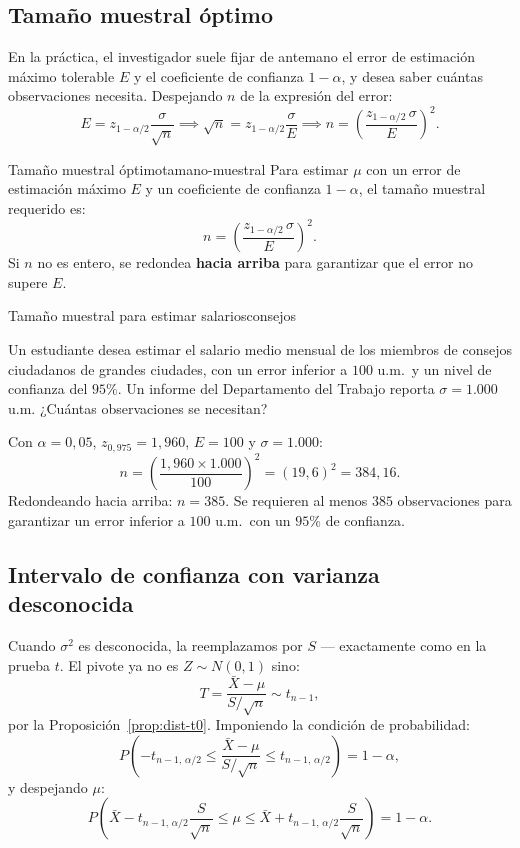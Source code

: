 \documentclass[12pt, a4paper]{book}
\numberwithin{equation}{chapter}
\begin{document}
\subsection{Tama\~{n}o muestral \'{o}ptimo}

En la pr\'{a}ctica, el investigador suele
fijar de antemano el error de estimaci\'{o}n
m\'{a}ximo tolerable $E$ y el coeficiente
de confianza $1-\alpha$, y desea saber
cu\'{a}ntas observaciones necesita. Despejando
$n$ de la expresi\'{o}n del error:
\[
E = z_{1-\alpha/2}
\frac{\sigma}{\sqrt{n}}
\implies \sqrt{n} =
z_{1-\alpha/2} \frac{\sigma}{E}
\implies n =
\left(\frac{z_{1-\alpha/2}\,
	\sigma}{E}\right)^2.
\]

\begin{definicion}{Tama\~{n}o muestral
		\'{o}ptimo}{tamano-muestral}
	Para estimar $\mu$ con un error de
	estimaci\'{o}n m\'{a}ximo $E$ y un
	coeficiente de confianza $1-\alpha$,
	el tama\~{n}o muestral requerido es:
	\[
	n = \left(\frac{z_{1-\alpha/2}\,
		\sigma}{E}\right)^2.
	\]
	Si $n$ no es entero, se redondea
	\textbf{hacia arriba} para garantizar
	que el error no supere $E$.
\end{definicion}

\begin{ejemplo}{Tama\~{n}o muestral para
		estimar salarios}{consejos}
	
	Un estudiante desea estimar el salario
	medio mensual de los miembros de consejos
	ciudadanos de grandes ciudades, con un
	error inferior a $100$ u.m.\ y un nivel
	de confianza del $95\%$. Un informe del
	Departamento del Trabajo reporta
	$\sigma = 1.000$ u.m. ¿Cu\'{a}ntas
	observaciones se necesitan?
	
	\medskip
	Con $\alpha = 0{,}05$, $z_{0{,}975} =
	1{,}960$, $E = 100$ y $\sigma = 1.000$:
	\[
	n = \left(\frac{1{,}960 \times 1.000}
	{100}\right)^2
	= (19{,}6)^2
	= 384{,}16.
	\]
	Redondeando hacia arriba: $n = 385$.
	Se requieren al menos $385$ observaciones
	para garantizar un error inferior a
	$100$ u.m.\ con un $95\%$ de confianza.
	
\end{ejemplo}

\subsection{Intervalo de confianza con
	varianza desconocida}

Cuando $\sigma^2$ es desconocida, la
reemplazamos por $S$ --- exactamente como
en la prueba $t$. El pivote ya no es
$Z \sim N(0,1)$ sino:
\[
T = \frac{\bar{X} - \mu}{S/\sqrt{n}}
\sim t_{n-1},
\]
por la Proposici\'{o}n~\ref{prop:dist-t0}.
Imponiendo la condici\'{o}n de probabilidad:
\[
P\!\left(-t_{n-1,\,\alpha/2} \leq
\frac{\bar{X} - \mu}{S/\sqrt{n}}
\leq t_{n-1,\,\alpha/2}\right)
= 1 - \alpha,
\]
y despejando $\mu$:
\[
P\!\left(\bar{X} - t_{n-1,\,\alpha/2}
\frac{S}{\sqrt{n}} \leq \mu \leq
\bar{X} + t_{n-1,\,\alpha/2}
\frac{S}{\sqrt{n}}\right)
= 1 - \alpha.
\]
\end{document}
